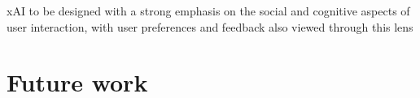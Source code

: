 
xAI to be designed with a strong emphasis on the social and cognitive aspects of user interaction, with user preferences and feedback also viewed through this lens



\section{Future work}
\label{sec:FutureWork}

